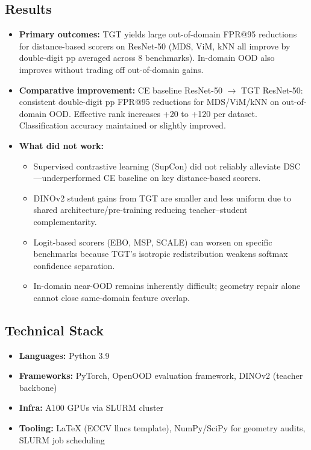 \documentclass{article}
\begin{document}
\subsection{Results}
\begin{itemize}
    \item \textbf{Primary outcomes:} TGT yields large out-of-domain FPR@95 reductions for distance-based scorers on ResNet-50 (MDS, ViM, kNN all improve by double-digit pp averaged across 8 benchmarks). In-domain OOD also improves without trading off out-of-domain gains.
    \item \textbf{Comparative improvement:} CE baseline ResNet-50 $\rightarrow$ TGT ResNet-50: consistent double-digit pp FPR@95 reductions for MDS/ViM/kNN on out-of-domain OOD. Effective rank increases +20 to +120 per dataset. Classification accuracy maintained or slightly improved.
    \item \textbf{What did not work:}
    \begin{itemize}
        \item Supervised contrastive learning (SupCon) did not reliably alleviate DSC---underperformed CE baseline on key distance-based scorers.
        \item DINOv2 student gains from TGT are smaller and less uniform due to shared architecture/pre-training reducing teacher--student complementarity.
        \item Logit-based scorers (EBO, MSP, SCALE) can worsen on specific benchmarks because TGT's isotropic redistribution weakens softmax confidence separation.
        \item In-domain near-OOD remains inherently difficult; geometry repair alone cannot close same-domain feature overlap.
    \end{itemize}
\end{itemize}

\subsection{Technical Stack}
\begin{itemize}
    \item \textbf{Languages:} Python 3.9
    \item \textbf{Frameworks:} PyTorch, OpenOOD evaluation framework, DINOv2 (teacher backbone)
    \item \textbf{Infra:} A100 GPUs via SLURM cluster
    \item \textbf{Tooling:} LaTeX (ECCV llncs template), NumPy/SciPy for geometry audits, SLURM job scheduling
\end{itemize}
\end{document}
